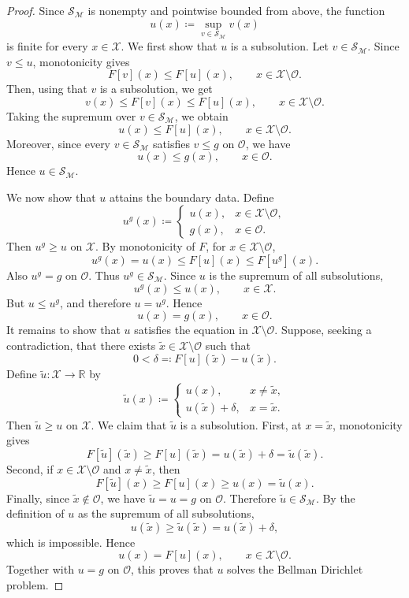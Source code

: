 \documentclass[reqno,11pt]{amsart}
\numberwithin{equation}{section}
\theoremstyle{definition}
\theoremstyle{remark}
\begin{document}
\begin{proof}
Since \(\mathcal S_{\mathcal M}\) is nonempty and pointwise bounded from above, the function
\[
    u(x) \coloneqq \sup_{v\in\mathcal S_{\mathcal M}}v(x)
\]
is finite for every \(x\in\mathcal X\). We first show that \(u\) is a subsolution. Let \(v\in\mathcal S_{\mathcal M}\). Since \(v\le u\), monotonicity gives
\[
    F[v](x)\le F[u](x),
    \qquad x\in\mathcal X\setminus\mathcal O.
\]
Then, using that \(v\) is a subsolution, we get
\[
    v(x)\le F[v](x)\le F[u](x),
    \qquad x\in\mathcal X\setminus\mathcal O.
\]
Taking the supremum over \(v\in\mathcal S_{\mathcal M}\), we obtain
\[
    u(x)\le F[u](x),
    \qquad x\in\mathcal X\setminus\mathcal O.
\]
Moreover, since every \(v\in\mathcal S_{\mathcal M}\) satisfies \(v\le g\)
on \(\mathcal O\), we have
\[
    u(x)\le g(x),
    \qquad x\in\mathcal O.
\]
Hence \(u\in\mathcal S_{\mathcal M}\).

We now show that \(u\) attains the boundary data. Define
\[
    u^g(x) \coloneqq 
    \begin{cases}
        u(x), & x\in\mathcal X\setminus\mathcal O,\\
        g(x), & x\in\mathcal O.
    \end{cases}
\]
Then \(u^g\ge u\) on \(\mathcal X\). By monotonicity of \(F\), for \(x\in\mathcal X\setminus\mathcal O\),
\[
    u^g(x)
    =
    u(x)
    \le
    F[u](x)
    \le
    F[u^g](x).
\]
Also \(u^g=g\) on \(\mathcal O\). Thus \(u^g\in\mathcal S_{\mathcal M}\). Since \(u\) is the supremum of all subsolutions,
\[
    u^g(x)\le u(x),
    \qquad x\in\mathcal X.
\]
But \(u\le u^g\), and therefore \(u=u^g\). Hence
\[
    u(x)=g(x),
    \qquad x\in\mathcal O.
\]
It remains to show that \(u\) satisfies the equation in
\(\mathcal X\setminus\mathcal O\). Suppose, seeking a contradiction, that
there exists \(\tilde x\in\mathcal X\setminus\mathcal O\) such that
\[
    0<\delta \eqqcolon F[u](\tilde x) - u(\tilde x).
\]
Define \(\tilde u \colon \mathcal X\to\mathbb R\) by
\[
    \tilde u(x) \coloneqq
    \begin{cases}
        u(x), & x\neq \tilde x,\\
        u(\tilde x)+\delta, & x=\tilde x.
    \end{cases}
\]
Then \(\tilde u\ge u\) on \(\mathcal X\). We claim that \(\tilde u\) is a
subsolution. First, at \(x=\tilde x\), monotonicity gives
\[
    F[\tilde u](\tilde x)
    \ge
    F[u](\tilde x)
    =
    u(\tilde x)+\delta
    =
    \tilde u(\tilde x).
\]
Second, if \(x\in\mathcal X\setminus\mathcal O\) and \(x\neq\tilde x\), then
\[
    F[\tilde u](x)
    \ge
    F[u](x)
    \ge
    u(x)
    =
    \tilde u(x).
\]
Finally, since \(\tilde x\notin\mathcal O\), we have \(\tilde u=u=g\) on \(\mathcal O\). Therefore \(\tilde u\in\mathcal S_{\mathcal M}\). By the definition of \(u\) as the supremum of all subsolutions,
\[
    u(\tilde x)
    \ge
    \tilde u(\tilde x)
    =
    u(\tilde x)+\delta,
\]
which is impossible. Hence
\[
    u(x)=F[u](x),
    \qquad x\in\mathcal X\setminus\mathcal O.
\]
Together with \(u=g\) on \(\mathcal O\), this proves that \(u\) solves the
Bellman Dirichlet problem.


\end{proof}
\end{document}

